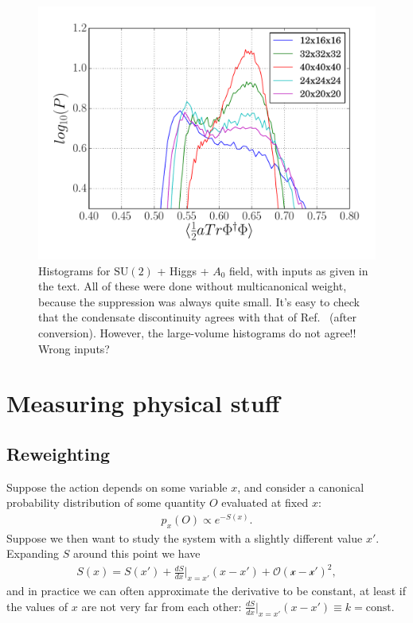 \documentclass[11pt,a4paper]{article}
\newcommand\gr[1]{\mathrm{#1}}%
\newcommand\lauri[1]{{\color{myorange}#1}}
\begin{document}
\begin{figure}[H]
	\includegraphics[scale=0.5]{hgrams_SM+A0}
	\caption{Histograms for $\gr{SU(2)}$ + Higgs + $A_0$ field, with inputs as given in the text. All of these were done without multicanonical weight, because the suppression was always quite small. It's easy to check that the condensate discontinuity agrees with that of Ref.~\cite{Kajantie:1995kf} (after conversion). \lauri{However, the large-volume histograms do not agree!! Wrong inputs?}}
\label{fig:hgrams_SM_A0}
\end{figure}


\section{Measuring physical stuff}

\subsection{Reweighting}

Suppose the action depends on some variable $x$, and consider a canonical probability distribution of some quantity $O$ evaluated at fixed $x$: 
\begin{align}
p_x(O) \propto e^{-S(x)}.
\end{align}
Suppose we then want to study the system with a slightly different value $x'$. Expanding $S$ around this point we have
\begin{align}
S(x) = S(x') + \frac{dS}{dx}\Big\vert_{x=x'} (x-x') + \mathcal{O(x-x')^2},
\end{align}
and in practice we can often approximate the derivative to be constant, at least if the values of $x$ are not very far from each other: $\frac{dS}{dx}\Big\vert_{x=x'} (x-x') \equiv k = \text{const}$. 
\end{document}
